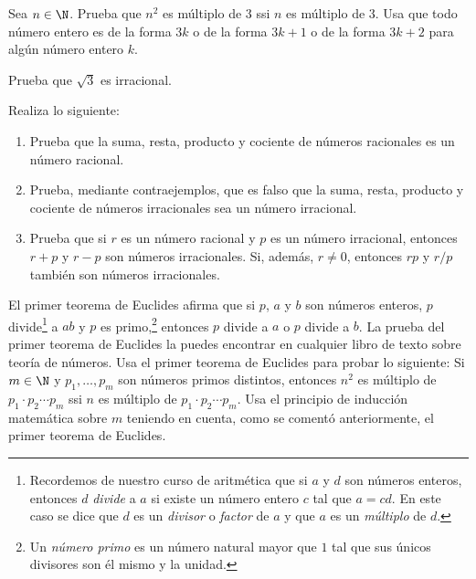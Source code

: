 \documentclass[12pt,a4paper]{book}
\begin{document}
    \begin{ejercicio}\label{ej:75}
        Sea $n\in\N$. Prueba que $n^{2}$ es múltiplo de $3$ ssi $n$ es múltiplo de
        $3$. \sugerencia Usa que todo número entero es de la forma $3k$ o de la forma
        $3k+1$ o de la forma $3k+2$ para algún número entero $k$.
    \end{ejercicio}

    \begin{ejercicio}\label{ej:76}
        Prueba que $\sqrt{3}$ es irracional.
    \end{ejercicio}

    \begin{ejercicio}\label{ej:77}
        Realiza lo siguiente:
        \begin{enumerate}[nosep]
            \item Prueba que la suma, resta, producto y cociente de números racionales es
            un número racional.
            \item Prueba, mediante contraejemplos, que es falso que la suma, resta, producto
            y cociente de números irracionales sea un número irracional.
            \item Prueba que si $r$ es un número racional y $p$ es un número irracional, entonces
            $r+p$ y $r-p$ son números irracionales. Si, además, $r\neq 0$, entonces $rp$ y
            $r/p$ también son números irracionales.
        \end{enumerate}
    \end{ejercicio}

    \begin{ejercicio}\label{ej:78}
        El primer teorema de Euclides afirma que si $p$, $a$ y $b$ son
        números enteros, $p$ divide\footnote{Recordemos de nuestro curso de aritmética que si $a$ y $d$ son números enteros, entonces
        $d$ \textit{divide} a $a$ si existe un número entero $c$ tal que $a=cd$. En este caso se dice que $d$ es un
        \textit{divisor} o \textit{factor} de $a$ y que $a$ es un \textit{múltiplo} de $d$.} a $ab$ y $p$ es primo,\footnote{Un \textit{número primo} es un número natural mayor que $1$ tal que sus únicos divisores son
        él mismo y la unidad.} entonces $p$ divide a $a$ o $p$ divide a
        $b$. La prueba del primer teorema de Euclides la puedes encontrar en cualquier
        libro de texto sobre teoría de números. Usa el primer teorema de Euclides
        para probar lo siguiente: Si $m\in\N$ y $p_{1},\ldots,p_{m}$ son números primos distintos,
        entonces $n^{2}$ es múltiplo de $p_{1}\cdot p_{2}\cdots p_{m}$ ssi $n$ es múltiplo de $p_{1}\cdot p_{2}\cdots p_{m}$.
        \sugerencia Usa el principio de inducción matemática sobre $m$ teniendo en
        cuenta, como se comentó anteriormente, el primer teorema de Euclides.
    \end{ejercicio}
\end{document}
